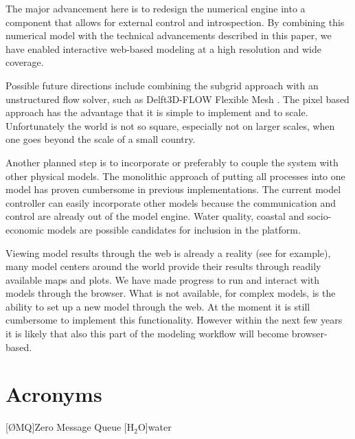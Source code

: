 \documentclass[a4paper]{article}
\begin{document}
The major advancement here is to redesign the numerical engine into a component that allows for external control and introspection. By combining this numerical model with the technical advancements described in this paper, we have enabled interactive web-based modeling at a high resolution and wide coverage.

Possible future directions include combining the subgrid approach with an unstructured flow solver, such as Delft3D-FLOW Flexible Mesh \citep{Kernkamp2011}. The pixel based approach has the advantage that it is simple to implement and to scale. Unfortunately the world is not so square, especially not on larger scales, when one goes beyond the scale of a small country.

Another planned step is to incorporate or preferably to couple the system with other physical models. The monolithic approach of putting all processes into one model has proven cumbersome in previous implementations. The current model controller can easily incorporate other models because the communication and control are already out of the model engine. Water quality, coastal and socio-economic models are possible candidates for inclusion in the platform.

Viewing model results through the web is already a reality (see \citep{Blower2013} for example), many model centers around the world provide their results through readily available maps and plots. We have made progress to run and interact with models through the browser. What is not available, for complex models, is the ability to set up a new model through the web. At the moment it is still cumbersome to implement this functionality. However within the next few years it is likely that also this part of the modeling workflow will become browser-based.



\section*{Acronyms}
\begin{acronym}[AAAAA]
[\O{}MQ]{Zero Message Queue}
[$\mathrm{H_2O}$]{water}
\end{acronym}
\end{document}
